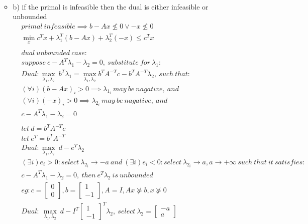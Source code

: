 \documentclass[12pt,letter]{article}
\begin{document}
\begin{enumerate}
\begin{itemize}
\begin{align*}
    \end{align*}
  \item b) if the primal is infeasible then the dual is either infeasible or unbounded
    \begin{align*}
      &primal\ infeasible \implies b-Ax \not\leq 0 \vee -x \not\leq 0\\
      &\min_x c^Tx +\lambda_1^T(b-Ax) + \lambda_2^T(-x) \leq c^Tx\\
      \\
      &dual\ unbounded\ case:\\
      &suppose\ c - A^T\lambda_1 - \lambda_2 = 0,\ substitute\ for\ \lambda_1:\\
      &Dual: \max_{\lambda_1,\lambda_2}\ b^T\lambda_1 = \max_{\lambda_1,\lambda_2} b^TA^{-T}c-b^TA^{-T}\lambda_2,\ such\ that:\\
      &(\forall i) (b-Ax)_i > 0 \implies \lambda_{1_i}\ may\ be\ nagative,\ and\\
      &(\forall i) (-x)_i > 0 \implies \lambda_{2_i}\ may\ be\ nagative,\ and\\
      &c - A^T\lambda_1 - \lambda_2 = 0\\
      \\
      &let\ d = b^TA^{-T}c\\
      &let\ e^T = b^TA^{-T}\\
      &Dual: \max_{\lambda_1,\lambda_2}\ d-e^T\lambda_2\\
      &(\exists i) e_i > 0: select\ \lambda_{2_i} \to -a \ and\ (\exists i) e_i < 0: select\ \lambda_{2_i} \to a, a \to +\infty \ such\ that\ it\ satisfies:\\
      &c - A^T\lambda_1 - \lambda_2 = 0,\ then\ e^T\lambda_2\ is\ unbounded\\
      &eg: c=\begin{bmatrix}0\\0\end{bmatrix}, b=\begin{bmatrix}1\\-1\end{bmatrix},A=I, Ax \not\succeq b, x \not\succeq 0\\
      &Dual:\ \max_{\lambda_1,\lambda_2}\ d- I^T\begin{bmatrix}1\\-1\end{bmatrix}^T\lambda_2,\ select\ \lambda_2 =\begin{bmatrix}-a\\a\end{bmatrix}\\

\end{align*}
\end{itemize}
\end{enumerate}
\end{document}
